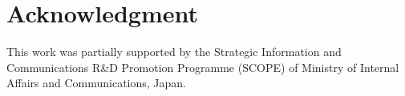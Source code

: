         
        
        \section*{Acknowledgment}
        This work was partially supported by the Strategic Information and Communications R\&D Promotion Programme (SCOPE) of Ministry of Internal Affairs and Communications, Japan.
        
        
        